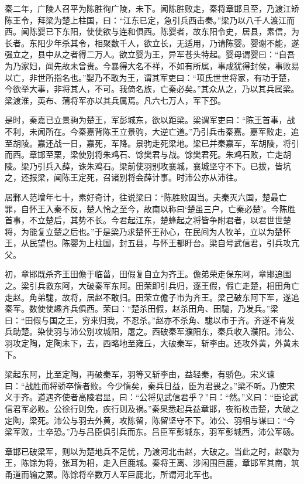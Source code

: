 \documentclass[]{article}
\begin{document}
秦二年，广陵人召平为陈胜徇广陵，未下。闻陈胜败走，秦将章邯且至，乃渡江矫陈王令，拜梁为楚上柱国，曰：``江东已定，急引兵西击秦。''梁乃以八千人渡江而西。闻陈婴已下东阳，使使欲与连和俱西。陈婴者，故东阳令史，居县，素信，为长者。东阳少年杀其令，相聚数千人，欲立长，无适用，乃请陈婴。婴谢不能，遂强立之，县中从之者得二万人。欲立婴为王，异军苍头特起。婴母谓婴曰：``自吾为乃家妇，闻先故未曾贵。今暴得大名不祥，不如有所属，事成犹得封侯，事败易以亡，非世所指名也。''婴乃不敢为王，谓其军吏曰：``项氏世世将家，有功于楚，今欲举大事，非将其人，不可。我倚名族，亡秦必矣。''其众从之，乃以其兵属梁。梁渡淮，英布、蒲将军亦以其兵属焉。凡六七万人，军下邳。

是时，秦嘉已立景驹为楚王，军彭城东，欲以距梁。梁谓军吏曰：``陈王首事，战不利，未闻所在。今秦嘉背陈王立景驹，大逆亡道。''乃引兵击秦嘉。嘉军败走，追至胡陵。嘉还战一日，嘉死，军降。景驹走死梁地。梁已并秦嘉军，军胡陵，将引而西。章邯至栗，梁使别将朱鸡石、馀樊君与战。馀樊君死。朱鸡石败，亡走胡陵。梁乃引兵入薛，诛朱鸡石。梁前使羽别攻襄城，襄城坚守不下。已拔，皆坑之，还报梁，闻陈王定死，召诸别将会薛计事。时沛公亦从沛往。

居鄛人范增年七十，素好奇计，往说梁曰：``陈胜败固当。夫秦灭六国，楚最亡罪，自怀王入秦不反，楚人怜之至今，故南以称曰`楚虽三户，亡秦必楚'。今陈胜首事，不立楚后，其势不长。今君起江东，楚蜂起之将皆争附君者，以君世世楚将，为能复立楚之后也。''于是梁乃求楚怀王孙心，在民间为人牧羊，立以为楚怀王，从民望也。陈婴为上柱国，封五县，与怀王都盱台。梁自号武信君，引兵攻亢父。

初，章邯既杀齐王田儋于临菑，田假复自立为齐王。儋弟荣走保东阿，章邯追围之。梁引兵救东阿，大破秦军东阿。田荣即引兵归，逐王假，假亡走楚，相田角亡走赵。角弟駹，故将，居赵不敢归。田荣立儋子市为齐王。梁己破东阿下军，遂追秦军。数使使趣齐兵俱西。荣曰：``楚杀田假，赵杀田角、田駹，乃发兵。''梁曰：``田假与国之王，穷来归我，不忍杀。''赵亦不杀角、駹以市于齐。齐遂不肯发兵助楚。染使羽与沛公别攻城阳，屠之。西破秦军濮阳东，秦兵收入濮阳。沛公、羽攻定陶，定陶未下，去，西略地至雍丘，大破秦军，斩李由。还攻外黄，外黄未下。

梁起东阿，比至定陶，再破秦军，羽等又斩李由，益轻秦，有骄色。宋义谏曰：``战胜而将骄卒惰者败。今少惰矣，秦兵日益，臣为君畏之。''梁不听。乃使宋义于齐。道遇齐使者高陵君显，曰：``公将见武信君乎？''曰：``然。''义曰：``臣论武信君军必败。公徐行则免，疾行则及祸。''秦果悉起兵益章邯，夜衔枚击楚，大破之定陶，梁死。沛公与羽去外黄，攻陈留，陈留坚守不下。沛公、羽相与谋曰：``今梁军败，士卒恐。''乃与吕臣俱引兵而东。吕臣军彭城东，羽军彭城西，沛公军砀。

章邯已破梁军，则以为楚地兵不足忧，乃渡河北击赵，大破之。当此之时，赵歇为王，陈馀为将，张耳为相，走入巨鹿城。秦将王离、涉闲围巨鹿，章邯军其南，筑甬道而输之粟。陈馀将卒数万人军巨鹿北，所谓河北军也。
\end{document}
